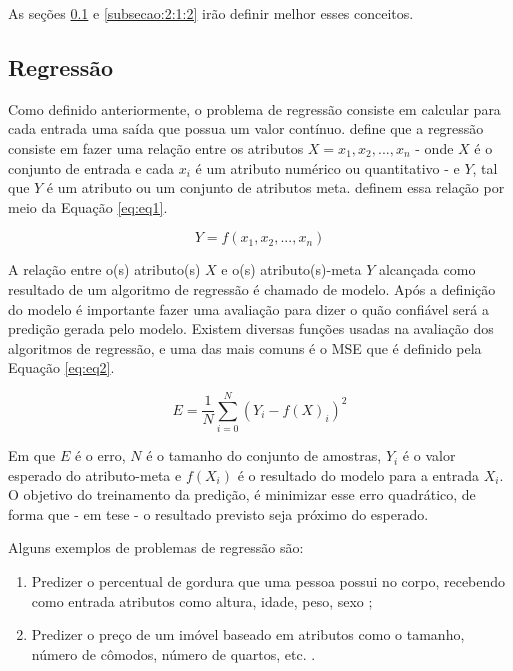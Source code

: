As seções \ref{subsecao:2:1:1} e \ref{subsecao:2:1:2} irão definir melhor esses conceitos.

\subsection{Regressão}
\label{subsecao:2:1:1}

Como definido anteriormente, o problema de regressão consiste em calcular para cada entrada uma saída que possua um valor contínuo.  define que a regressão consiste em fazer uma relação entre os atributos $X={x_1, x_2,..., x_n}$ - onde $X$ é o conjunto de entrada e cada $x_i$ é um atributo numérico ou quantitativo - e $Y$, tal que $Y$ é um atributo ou um conjunto de atributos meta.  definem essa relação por meio da Equação  \ref{eq:eq1}.

\begin{equation}
\label{eq:eq1}
	Y = f(x_1, x_2,..., x_n)
\end{equation}

A relação entre o(s) atributo(s) $X$ e o(s) atributo(s)-meta $Y$ alcançada como resultado de um algoritmo de regressão é chamado de modelo. Após a definição do modelo é importante fazer uma avaliação para dizer o quão confiável será a predição gerada pelo modelo. Existem diversas funções usadas na avaliação dos algoritmos de regressão, e uma das mais comuns é o \ac{MSE} que é definido pela Equação  \ref{eq:eq2}.

\begin{equation}
\label{eq:eq2}
	E = \dfrac{1}{N}\sum_{i = 0}^{N}(Y_i - f(X)_i)^2
\end{equation}

\noindent
Em que $E$ é o erro, $N$ é o tamanho do conjunto de amostras, $Y_i$ é o valor esperado do atributo-meta e $f(X_i)$ é o resultado do modelo para a entrada $X_i$. O objetivo do treinamento da predição, é minimizar esse erro quadrático, de forma que - em tese - o resultado previsto seja próximo do esperado.

Alguns exemplos de problemas de regressão são: 

\begin{enumerate}
	\item Predizer o percentual de gordura que uma pessoa possui no corpo, recebendo como entrada atributos como altura, idade, peso, sexo \cite{dosualdo-2003};
	\item Predizer o preço de um imóvel baseado em atributos como o tamanho, número de cômodos, número de quartos, etc. \cite{pereira-2012}.
\end{enumerate}

